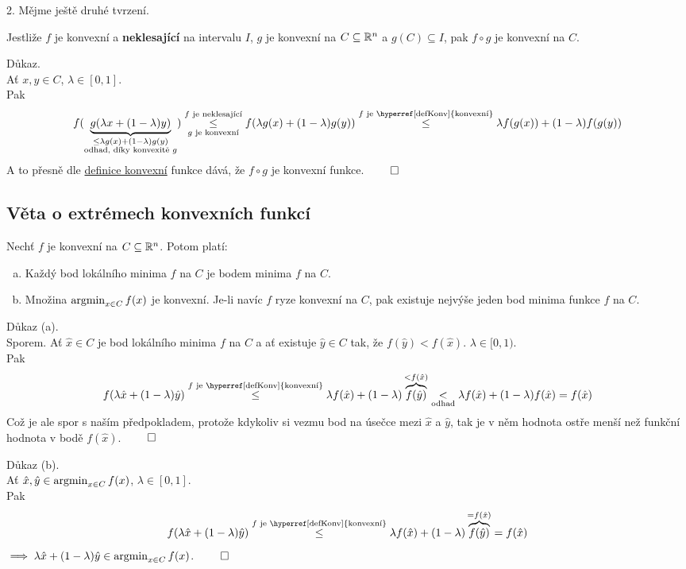2. Mějme ještě druhé tvrzení.

Jestliže $f$ je konvexní a \textbf{neklesající} na intervalu $I$, $g$ je konvexní na $C \subseteq \mathbb{R}^n$ a $g(C) \subseteq I$, pak 
$f \circ g$ je konvexní na $C$.

Důkaz.\\
Ať $x, y \in C$, $\lambda \in [0,1]$.\\
Pak
\[
    f(\underbrace{g(\lambda x + (1-\lambda)y)}_{\substack{\leq \lambda g(x) + (1-\lambda)g(y) \\ \text{odhad, díky konvexitě }g }}) 
    \underset{g \text{ je konvexní}}{\overset{f \text{ je neklesající}}{\leq}} f(\lambda g(x) + (1- \lambda) g(y)) 
    \overset{f \text{ je \hyperref[defKonv]{konvexní}}}{\leq} \lambda f(g(x)) + (1-\lambda) f(g(y))
\]
A to přesně dle \hyperref[defKonv]{definice konvexní} funkce dává, že $f \circ g$ je konvexní funkce. $\qed$

\subsection{Věta o extrémech konvexních funkcí}
Nechť $f$ je konvexní na $C \subseteq \mathbb{R}^n$. Potom platí:
\begin{enumerate}[(a)]
    \item Každý bod lokálního minima $f$ na $C$ je bodem minima $f$ na $C$.
    \item Množina $\operatorname*{argmin}_{x \in C} f(x)$ je konvexní. Je-li navíc $f$ ryze konvexní na $C$, pak existuje nejvýše jeden
    bod minima funkce $f$ na $C$. 
\end{enumerate}

Důkaz (a).\\
Sporem. Ať $\hat x \in C$ je bod lokálního minima $f$ na $C$ a ať existuje $\hat y \in C$ tak, že $f(\hat y) < f(\hat x)$.
$\lambda \in [0,1)$.\\
Pak
\[
    f(\lambda \hat x + (1-\lambda) \hat y) \overset{f \text{ je \hyperref[defKonv]{konvexní}}}{\leq}
    \lambda f(\hat x) + (1-\lambda) \overbrace{f(\hat y)}^{< f(\hat x)} \underset{\text{odhad}}{<} 
    \lambda f(\hat x) + (1-\lambda) f(\hat x) = f(\hat x)
\]
Což je ale spor s naším předpokladem, protože kdykoliv si vezmu bod na úsečce mezi $\hat x$ a $\hat y$, tak je v něm 
hodnota ostře menší než funkční hodnota v bodě $f(\hat x)$. $\qed$

Důkaz (b).\\
Ať $\hat x, \hat y \in \operatorname*{argmin}_{x \in C} f(x)$, $\lambda \in [0,1]$.\\
Pak
\[
    f(\lambda \hat x + (1-\lambda) \hat y) \overset{f \text{ je \hyperref[defKonv]{konvexní}}}\leq \lambda f(\hat x) + 
    (1-\lambda) \overbrace{f(\hat y)}^{= f(\hat x)} = f(\hat x)
\]
$\implies \lambda \hat x + (1-\lambda) \hat y \in \operatorname*{argmin}_{x \in C} f(x)$. $\qed$
\\

